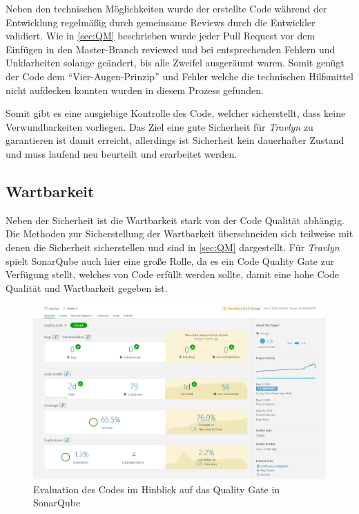 	Neben den technischen Möglichkeiten wurde der erstellte Code während der Entwicklung regelmäßig durch gemeinsame Reviews durch die Entwickler validiert. Wie in \autoref{sec:QM} beschrieben wurde jeder Pull Request vor dem Einfügen in den Master-Branch reviewed und bei entsprechenden Fehlern und Unklarheiten solange geändert, bis alle Zweifel ausgeräumt waren. Somit genügt der Code dem \enquote{Vier-Augen-Prinzip} und Fehler welche die technischen Hilfsmittel nicht aufdecken konnten wurden in diesem Prozess gefunden.
	
	\vspace{0.25cm}
	
	Somit gibt es eine ausgiebige Kontrolle des Code, welcher sicherstellt, dass keine Verwundbarkeiten vorliegen. Das Ziel eine gute Sicherheit für \textit{Travlyn} zu garantieren ist damit erreicht, allerdings ist Sicherheit kein dauerhafter Zustand und muss laufend neu beurteilt und erarbeitet werden.
	
	\subsection{Wartbarkeit}
	Neben der Sicherheit ist die Wartbarkeit stark von der Code Qualität abhängig. Die Methoden zur Sicherstellung der Wartbarkeit überschneiden sich teilweise mit denen die Sicherheit sicherstellen und sind in \autoref{sec:QM} dargestellt. Für \textit{Travlyn} spielt SonarQube auch hier eine große Rolle, da es ein Code Quality Gate zur Verfügung stellt, welches von Code erfüllt werden sollte, damit eine hohe Code Qualität und Wartbarkeit gegeben ist.
	
	\begin{figure}[ht!]
		\centering
		\includegraphics[width=1\textwidth]{images/sonar_passed_QG.png}
		\caption{Evaluation des Codes im Hinblick auf das Quality Gate in SonarQube}
		\label{fig:soarqube_QG}
	\end{figure}
	
